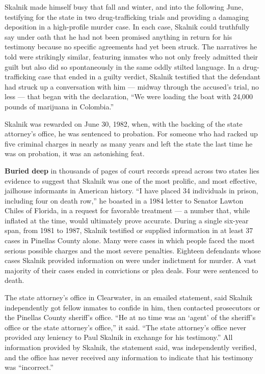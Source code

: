 Skalnik made himself busy that fall and winter, and into the following
June, testifying for the state in two drug-trafficking trials and
providing a damaging deposition in a high-profile murder case. In each
case, Skalnik could truthfully say under oath that he had not been
promised anything in return for his testimony because no specific
agreements had yet been struck. The narratives he told were strikingly
similar, featuring inmates who not only freely admitted their guilt but
also did so spontaneously in the same oddly stilted language. In a
drug-trafficking case that ended in a guilty verdict, Skalnik testified
that the defendant had struck up a conversation with him --- midway
through the accused's trial, no less --- that began with the
declaration, ``We were loading the boat with 24,000 pounds of marijuana
in Colombia.''

Skalnik was rewarded on June 30, 1982, when, with the backing of the
state attorney's office, he was sentenced to probation. For someone who
had racked up five criminal charges in nearly as many years and left the
state the last time he was on probation, it was an astonishing feat.

\textbf{Buried deep} in thousands of pages of court records spread
across two states lies evidence to suggest that Skalnik was one of the
most prolific, and most effective, jailhouse informants in American
history. ``I have placed 34 individuals in prison, including four on
death row,'' he boasted in a 1984 letter to Senator Lawton Chiles of
Florida, in a request for favorable treatment --- a number that, while
inflated at the time, would ultimately prove accurate. During a single
six-year span, from 1981 to 1987, Skalnik testified or supplied
information in at least 37 cases in Pinellas County alone. Many were
cases in which people faced the most serious possible charges and the
most severe penalties. Eighteen defendants whose cases Skalnik provided
information on were under indictment for murder. A vast majority of
their cases ended in convictions or plea deals. Four were sentenced to
death.

The state attorney's office in Clearwater, in an emailed statement, said
Skalnik independently got fellow inmates to confide in him, then
contacted prosecutors or the Pinellas County sheriff's office. ``He at
no time was an `agent' of the sheriff's office or the state attorney's
office,'' it said. ``The state attorney's office never provided any
leniency to Paul Skalnik in exchange for his testimony.'' All
information provided by Skalnik, the statement said, was independently
verified, and the office has never received any information to indicate
that his testimony was ``incorrect.''

